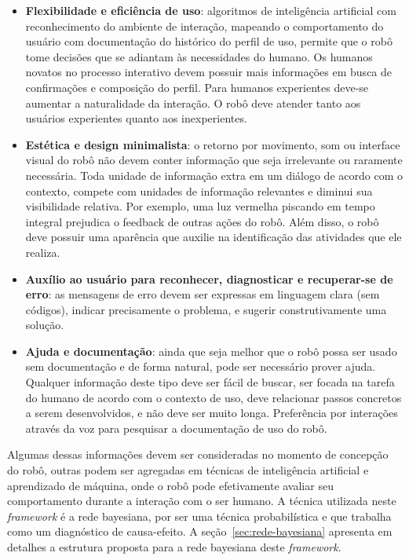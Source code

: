 \begin{itemize}
	\item \textbf{Flexibilidade e eficiência de uso}: algoritmos de inteligência artificial com reconhecimento do ambiente de interação, mapeando o comportamento do usuário com documentação do histórico do perfil de uso, permite que o robô tome decisões que se adiantam às necessidades do humano. Os humanos novatos no processo interativo devem possuir mais informações em busca de confirmações e composição do perfil. Para humanos experientes deve-se aumentar a naturalidade da interação. O robô deve atender tanto aos usuários experientes quanto aos inexperientes.
	\item \textbf{Estética e design minimalista}: o retorno por movimento, som ou interface visual do robô não devem conter informação que seja irrelevante ou raramente necessária. Toda unidade de informação extra em um diálogo de acordo com o contexto, compete com unidades de informação relevantes e diminui sua visibilidade relativa. Por exemplo, uma luz vermelha piscando em tempo integral prejudica o feedback de outras ações do robô. Além disso, o robô deve possuir uma aparência que auxilie na identificação das atividades que ele realiza.
	\item \textbf{Auxílio ao usuário para reconhecer, diagnosticar e recuperar-se de erro}: as mensagens de erro devem ser expressas em linguagem clara (sem códigos), indicar precisamente o problema, e sugerir construtivamente uma solução.
	\item \textbf{Ajuda e documentação}: ainda que seja melhor que o robô possa ser usado sem documentação e de forma natural, pode ser necessário prover ajuda. Qualquer informação deste tipo deve ser fácil de buscar, ser focada na tarefa do humano de acordo com o contexto de uso, deve relacionar passos concretos a serem desenvolvidos, e não deve ser muito longa. Preferência por interações através da voz para pesquisar a documentação de uso do robô.
\end{itemize}

Algumas dessas informações devem ser consideradas no momento de concepção do robô, outras podem ser agregadas em técnicas de inteligência artificial e aprendizado de máquina, onde o robô pode efetivamente avaliar seu comportamento durante a interação com o ser humano. A técnica utilizada neste \emph{framework} é a rede bayesiana, por ser uma técnica probabilística e que trabalha como um diagnóstico de causa-efeito. A seção~\ref{sec:rede-bayesiana} apresenta em detalhes a estrutura proposta para a rede bayesiana deste \emph{framework}.

